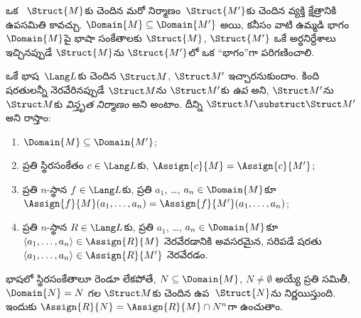 \documentclass[../../../include/open-logic-section]{subfiles}
\begin{document}

ఒక ~$\Struct{M}$కు చెందిన
 మరో నిర్మాణం~$\Struct{M'}$కు చెందిన
వ్యక్తి క్షేత్రానికి ఉపసమితి కావచ్చు. $\Domain{M} \subseteq
\Domain{M'}$ అయి, కనీసం వాటి ఉమ్మడి భాగం~$\Domain{M}$పై భాషా
సంకేతాలకు $\Struct{M}$, $\Struct{M'}$ ఒకే అర్థనిర్దేశాలు
ఇచ్చినప్పుడే $\Struct{M}$ను $\Struct{M'}$లో ఒక ``భాగం''గా
పరిగణించాలి.

\begin{defn}
ఒకే భాష~$\Lang L$కు చెందిన 
$\Struct M$, $\Struct M'$ ఇచ్చారనుకుందాం. కింది షరతులన్నీ నెరవేరినప్పుడే $\Struct M$ను $\Struct M'$కు
\emph{ఉప} అని,
$\Struct M'$ను $\Struct M$కు \emph{విస్తృత నిర్మాణం} అని అంటాం.
దీన్ని $\Struct M \substruct \Struct M'$ అని రాస్తాం:
\begin{enumerate}
\item $\Domain{M} \subseteq \Domain{M'}$;
\item ప్రతి స్థిరసంకేతం $c \in \Lang L$కు, $\Assign{c}{M} =
    \Assign{c}{M'}$;
\item ప్రతి $n$-స్థాన  $f \in \Lang L$కు,
  ప్రతి $a_1$, \dots, $a_n \in \Domain{M}$కూ
  $\Assign{f}{M}(a_1, \dots, a_n) = \Assign{f}{M'}(a_1, \dots, a_n)$;
\item ప్రతి $n$-స్థాన  $R \in \Lang L$కు,
  ప్రతి $a_1$, \dots, $a_n \in \Domain{M}$కూ $\langle
  a_1, \dots, a_n\rangle \in \Assign{R}{M}$ నెరవేరడానికి అవసరమైన, సరిపడే షరతు
  $\langle a_1, \dots, a_n\rangle \in \Assign{R}{M'}$ నెరవేరడం.
\end{enumerate}
\end{defn}

\begin{rem}
భాషలో స్థిరసంకేతాలూ  రెండూ లేకపోతే,
$N \subseteq \Domain{M}$, $N \ne \emptyset$ అయ్యే ప్రతి సమితీ,
~$\Domain{N}=N$ గల $\Struct M$కు చెందిన
ఉప\-~$\Struct{N}$ను నిర్ణయిస్తుంది. ఇందుకు
$\Assign{R}{N} = \Assign{R}{M} \cap N^n$గా ఉంచుతాం.
\end{rem}

\end{document}
